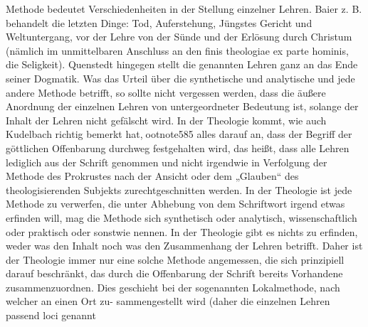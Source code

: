 Methode bedeutet Verschiedenheiten in der Stellung einzelner Lehren. Baier z. B. behandelt die letzten Dinge: Tod, Auferstehung, Jüngstes Gericht und Weltuntergang, vor der Lehre von der Sünde und der Erlösung durch Christum (nämlich im unmittelbaren Anschluss an den finis theologiae ex parte hominis, die Seligkeit). Quenstedt hingegen stellt die genannten Lehren ganz an das Ende seiner Dogmatik. Was das Urteil über die synthetische und analytische und jede andere Methode betrifft, so sollte nicht vergessen werden, dass die äußere Anordnung der einzelnen Lehren von untergeordneter Bedeutung ist, solange der Inhalt der Lehren nicht gefälscht wird. In der Theologie kommt, wie auch Kudelbach richtig bemerkt hat,ootnote{585} alles darauf an, dass der Begriff der göttlichen Offenbarung durchweg festgehalten wird, das heißt, dass alle Lehren lediglich aus der Schrift genommen und nicht irgendwie in Verfolgung der Methode des Prokrustes nach der Ansicht oder dem „Glauben“ des theologisierenden Subjekts zurechtgeschnitten werden. In der Theologie ist jede Methode zu verwerfen, die unter Abhebung von dem Schriftwort irgend etwas erfinden will, mag die Methode sich synthetisch oder analytisch, wissenschaftlich oder praktisch oder sonstwie nennen. In der Theologie gibt es nichts zu erfinden, weder was den Inhalt noch was den Zusammenhang der Lehren betrifft. Daher ist der Theologie immer nur eine solche Methode angemessen, die sich prinzipiell darauf beschränkt, das durch die Offenbarung der Schrift bereits Vorhandene zusammenzuordnen. Dies geschieht bei der sogenannten Lokalmethode, nach welcher an einen Ort zu- sammengestellt wird (daher die einzelnen Lehren passend loci genannt


